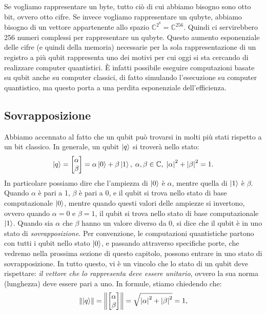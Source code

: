 \documentclass{book}
\theoremstyle{definition}
\theoremstyle{definition}
\theoremstyle{definition}
\theoremstyle{plain}
\theoremstyle{plain}
\theoremstyle{plain}
\theoremstyle{plain}
\begin{document}
\noindent Se vogliamo rappresentare un byte, tutto ciò di cui abbiamo bisogno sono otto bit, ovvero otto cifre. Se invece vogliamo rappresentare un qubyte, abbiamo bisogno di un vettore appartenente allo spazio $\mathbb{C}^{2^8} = \mathbb{C}^{256}$. Quindi ci servirebbero 256 numeri complessi per rappresentare un qubyte. Questo aumento esponenziale delle cifre (e quindi della memoria) necessarie per la sola rappresentazione di un registro a più qubit rappresenta uno dei motivi per cui oggi si sta cercando di realizzare computer quantistici. È infatti possibile eseguire computazioni basate su qubit anche su computer classici, di fatto simulando l'esecuzione su computer quantistico, ma questo porta a una perdita esponenziale dell'efficienza.

\subsection{Sovrapposizione}
Abbiamo accennato al fatto che un qubit può trovarsi in molti più stati rispetto a un bit classico. In generale, un qubit $\ket{q}$ si troverà nello stato:
\begin{displaymath}
\ket{q} = 
\begin{bmatrix}
\alpha\\
\beta
\end{bmatrix}
= \alpha \ket{0} + \beta \ket{1}, \; \alpha, \beta \in \mathbb{C}, \; \left\lvert \alpha \right\rvert^{2} + \left\lvert \beta \right\rvert^{2} = 1.
\end{displaymath}
In particolare possiamo dire che l'ampiezza di $\ket{0}$ è $\alpha$, mentre quella di $\ket{1}$ è $\beta$. Quando $\alpha$ è pari a 1, $\beta$ è pari a 0, e il qubit si trova nello stato di base computazionale $\ket{0}$, mentre quando questi valori delle ampiezze si invertono, ovvero quando $\alpha = 0$ e $\beta = 1$, il qubit si trova nello stato di base computazionale $\ket{1}$. Quando sia $\alpha$ che $\beta$ hanno un valore diverso da 0, si dice che il qubit è in uno stato di \emph{sovrapposizione}. Per convenzione, le computazioni quantistiche partono con tutti i qubit nello stato $\ket{0}$, e passando attraverso specifiche porte, che vedremo nella prossima sezione di questo capitolo, possono entrare in uno stato di sovrapposizione. In tutto questo, vi è un vincolo che lo stato di un qubit deve rispettare: \emph{il vettore che lo rappresenta deve essere unitario}, ovvero la sua norma (lunghezza) deve essere pari a uno. In formule, stiamo chiedendo che:
\begin{displaymath}
\left\lVert \ket{q} \right\rVert = \left\lVert
\begin{bmatrix}
\alpha\\
\beta
\end{bmatrix}
\right\rVert
= \sqrt{\left\lvert \alpha \right\rvert^{2} + \left\lvert \beta \right\rvert^{2}} = 1 ,
\end{displaymath}
\end{document}
